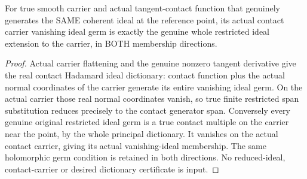 \begin{lemma}
\label{hir:sharp-actual-contact-hadamard-restricted-extension-ideal-dictionary}
\leanok
For true smooth carrier and actual tangent-contact function that genuinely
generates the SAME coherent ideal at the reference point, its actual contact
carrier vanishing ideal germ is exactly the genuine whole restricted ideal
extension to the carrier, in BOTH membership directions.
\end{lemma}
\begin{proof}
Actual carrier flattening and the genuine nonzero tangent derivative give the
real contact Hadamard ideal dictionary: contact function plus the actual normal
coordinates of the carrier generate its entire vanishing ideal germ. On the
actual carrier those real normal coordinates vanish, so true finite restricted
span substitution reduces precisely to the contact generator span. Conversely
every genuine original restricted ideal germ is a true contact multiple on the
carrier near the point, by the whole principal dictionary. It vanishes on the
actual contact carrier, giving its actual vanishing-ideal membership. The same
holomorphic germ condition is retained in both directions. No reduced-ideal,
contact-carrier or desired dictionary certificate is input.
\end{proof}

